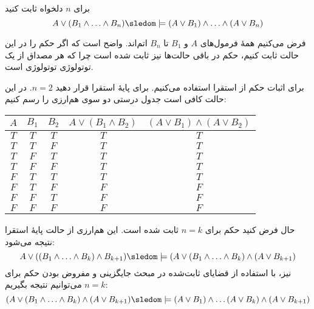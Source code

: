 برای $n$ دلخواه ثابت کنید
$$
A\vee (B_1\wedge\ldots\wedge B_n)\sledom\models(A\vee B_1)\wedge\ldots\wedge(A\vee B_n)
$$
\begin{ans}
فرض می‌کنیم همهٔ فرمول‌های $A$ و $B_1$ تا $B_n$ اتم‌اند. واضح است که اگر حکم را در این حالت ثابت کنیم، حکم در باقی حالت‌ها نیز ثابت شده است چرا که هر مصداق از یک توتولوژی توتولوژی است.

برای اثبات حکم از استقرا استفاده می‌کنیم. برای پایهٔ استقرا قرار دهید $n=2$. در این حالت کافی است جدول درستی دو سوی هم‌ارزی را رسم کنیم:
\LTR\begin{center}
\begin{tabular}{c|c|c|c|c}
$A$ & $B_1$ & $B_2$ & $A\vee(B_1\wedge B_2)$ & $(A\vee B_1)\wedge(A\vee B_2)$ \\
\hline
$T$ & $T$ & $T$ & $T$ & $T$ \\
$T$ & $T$ & $F$ & $T$ & $T$ \\
$T$ & $F$ & $T$ & $T$ & $T$ \\
$T$ & $F$ & $F$ & $T$ & $T$ \\
$F$ & $T$ & $T$ & $T$ & $T$ \\
$F$ & $T$ & $F$ & $F$ & $F$ \\
$F$ & $F$ & $T$ & $F$ & $F$ \\
$F$ & $F$ & $F$ & $F$ & $F$ \\
\end{tabular}
\end{center}\RTL
حال فرض کنید حکم برای $n=k$ ثابت شده است. این هم‌ارزی از حالت پایهٔ استقرا نتیجه می‌شود:
$$
A\vee ((B_1\wedge\ldots\wedge B_k)\wedge B_{k+1})\sledom\models (A\vee (B_1\wedge\ldots\wedge B_k)\wedge (A\vee B_{k+1})
$$
نیز، با استفاده از قضایای ثابت‌شده در مبحث جایگزینی و مفروض بودن حکم برای $n=k$ می‌توانیم نتیجه بگیریم:
$$
(A\vee (B_1\wedge\ldots\wedge B_k)\wedge (A\vee B_{k+1})\sledom\models(A\vee B_1)\wedge\ldots(A\vee B_k)\wedge(A\vee B_{k+1})
$$

\end{ans}
